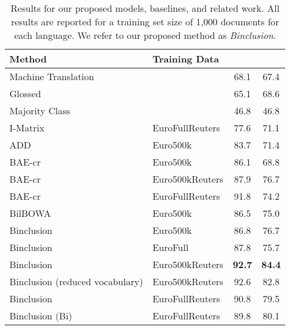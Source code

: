 \documentclass{article} \usepackage{iclr2015,times}
\newcommand{\modelname}{Binclusion }
\begin{document}
\begin{table}[t]
    \caption{Results for our proposed models, baselines, and related work.
        All results are reported for a training set size of 1,000 documents
    for each language. We refer to our proposed method as \emph{Binclusion}.}
    \label{tab:classification-results}
    \begin{center}
        \begin{tabular}{p{17em}lcc}
    \toprule
    Method  & Training Data &  &  \\
    \midrule
    Machine Translation                                     && 68.1          & 67.4   \\
    Glossed                                                 && 65.1          & 68.6   \\
    Majority Class                                          && 46.8          & 46.8   \\
    \midrule
    I-Matrix\hfill\citep{klementiev2012inducing} & EuroFullReuters  & 77.6          & 71.1   \\
    ADD\hfill\citep{hermann2014multilingual} & Euro500k          & 83.7          & 71.4   \\
    BAE-cr\hfill\citep{chandar2014autoencoder} & Euro500k        & 86.1          & 68.8   \\
    BAE-cr\hfill\citep{chandar2014autoencoder} & Euro500kReuters & 87.9          & 76.7   \\
    BAE-cr\hfill\citep{chandar2014autoencoder} & EuroFullReuters & 91.8 & 74.2   \\
    BilBOWA\hfill\citep{gouws2014bilbowa} & Euro500k             & 86.5          & 75.0   \\
    \midrule
    
    \modelname  &Euro500k                                  & 86.8          & 76.7   \\ 
    \modelname  &EuroFull                                  & 87.8          & 75.7   \\ 
    \modelname  &Euro500kReuters                           & \textbf{92.7}          & \textbf{84.4}   \\ 
    \modelname  (reduced vocabulary) &Euro500kReuters                              & 92.6          & 82.8   \\   
    \modelname  &EuroFullReuters                           & 90.8          & 79.5   \\ 
    \modelname  (Bi) &EuroFullReuters                       & 89.8          & 80.1   \\ 
    \bottomrule
    \end{tabular}
    \end{center}
\end{table}
\end{document}

